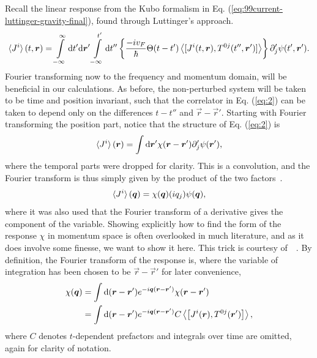 Recall the linear response from the Kubo formalism in Eq. (\ref{eq:99current-luttinger-gravity-final}), found through Luttinger's approach.
\begin{equation}
  \label{eq:2}
  \braket{J^i}(t, \vec{r}) =
  \int\limits_{-\infty }^{\infty } \mathrm{d}t' \mathrm{d}\vec{r}'
  \int\limits_{-\infty }^{t'} \mathrm{d}t''
  \left\{
    \frac{-i v_F}{\hbar } \Theta (t-t')
    \Braket{
      [J^i(t, \vec{r}), T^{0j} (t'', \vec{r}')]
    }
  \right\}
  \partial _j' \psi (t', \vec{r}').
\end{equation}
Fourier transforming now to the frequency and momentum domain, will be beneficial in our calculations.
As before, the non-perturbed system will be taken to be time and position invariant, such that the correlator in Eq. (\ref{eq:2}) can be taken to depend only on the differences $t-t''$ and $\vec{r} - \vec{r}' $.
Starting with Fourier transforming the position part, notice that the structure of Eq. (\ref{eq:2}) is
\[
  \braket{J^i}(\vec{r}) = \int \mathrm{d} \vec{r}' \chi (\vec{r} - \vec{r}') \partial _j' \psi  (\vec{r}'),
\]
where the temporal parts were dropped for clarity.
This is a convolution, and the Fourier transform is thus simply given by the product of the two factors~\cite{rottmannMatematiskFormelsamling1995}.
\begin{equation}
  \braket{J^i}(\vec{q}) =
  \chi (\vec{q}) (iq_j) \psi (\vec{q}),
\end{equation}
where it was also used that the Fourier transform of a derivative gives the component of the variable.
Showing explicitly how to find the form of the response $\chi $ in momentum space is often overlooked in much literature, and as it does involve some finesse, we want to show it here.
This trick is courtesy of~\citeauthor{changLectureNotesManybody2018}~\cite{changLectureNotesManybody2018}.
By definition, the Fourier transform of the response is, where the variable of integration has been chosen to be $\vec{r}-\vec{r}'$ for later convenience,
\begin{align}
  \chi (\vec{q}) &= \int \mathrm{d}(\vec{r} - \vec{r}') e^{-i\vec{q}(\vec{r}-\vec{r}')} \chi (\vec{r} - \vec{r}')\\
                 &= \int \mathrm{d}(\vec{r} - \vec{r}') e^{-i\vec{q}(\vec{r}-\vec{r}')} C \Braket{
                   \left[
J^i (\vec{r}), T^{0j}(\vec{r}')
                   \right]},\\
\end{align}
where $C$ denotes $t$-dependent prefactors and integrals over time are omitted, again for clarity of notation.
